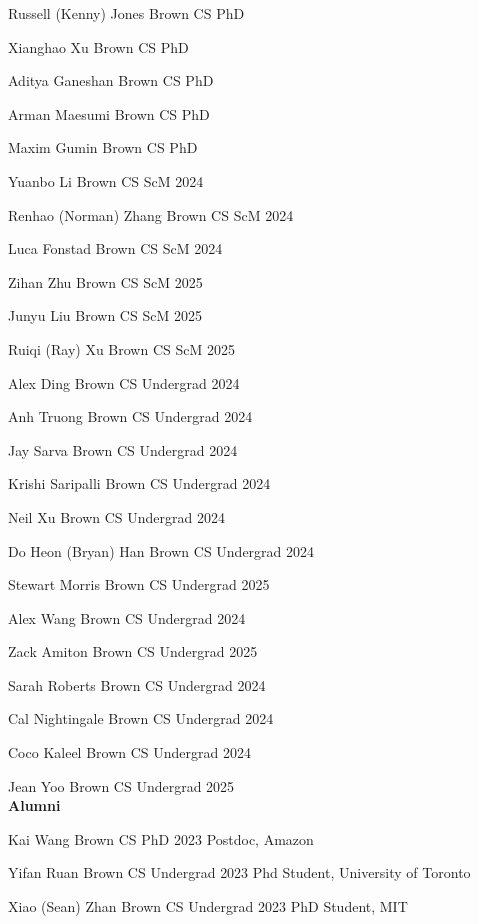\documentclass[line,margin]{res}
\begin{document}
\begin{resume}
\currentphd
{Russell (Kenny) Jones}
{Brown CS PhD}

\currentphd
{Xianghao Xu}
{Brown CS PhD}

\currentphd
{Aditya Ganeshan}
{Brown CS PhD}

\currentphd
{Arman Maesumi}
{Brown CS PhD}

\currentphd
{Maxim Gumin}
{Brown CS PhD}

\student
{Yuanbo Li}
{Brown CS ScM}
{2024}

\student
{Renhao (Norman) Zhang}
{Brown CS ScM}
{2024}

\student
{Luca Fonstad}
{Brown CS ScM}
{2024}

\student
{Zihan Zhu}
{Brown CS ScM}
{2025}

\student
{Junyu Liu}
{Brown CS ScM}
{2025}

\student
{Ruiqi (Ray) Xu}
{Brown CS ScM}
{2025}

\student
{Alex Ding}
{Brown CS Undergrad}
{2024}

\student
{Anh Truong}
{Brown CS Undergrad}
{2024}

\student
{Jay Sarva}
{Brown CS Undergrad}
{2024}

\student
{Krishi Saripalli}
{Brown CS Undergrad}
{2024}

\student
{Neil Xu}
{Brown CS Undergrad}
{2024}

\student
{Do Heon (Bryan) Han}
{Brown CS Undergrad}
{2024}

\student
{Stewart Morris}
{Brown CS Undergrad}
{2025}

\student
{Alex Wang}
{Brown CS Undergrad}
{2024}

\student
{Zack Amiton}
{Brown CS Undergrad}
{2025}

\student
{Sarah Roberts}
{Brown CS Undergrad}
{2024}

\student
{Cal Nightingale}
{Brown CS Undergrad}
{2024}

\student
{Coco Kaleel}
{Brown CS Undergrad}
{2024}

\student
{Jean Yoo}
{Brown CS Undergrad}
{2025}
\\


\textbf{Alumni}

\alumni
{Kai Wang}
{Brown CS PhD}
{2023}
{Postdoc, Amazon}

\alumni
{Yifan Ruan}
{Brown CS Undergrad}
{2023}
{Phd Student, University of Toronto}

\alumni
{Xiao (Sean) Zhan}
{Brown CS Undergrad}
{2023}
{PhD Student, MIT}


\end{resume}
\end{document}
